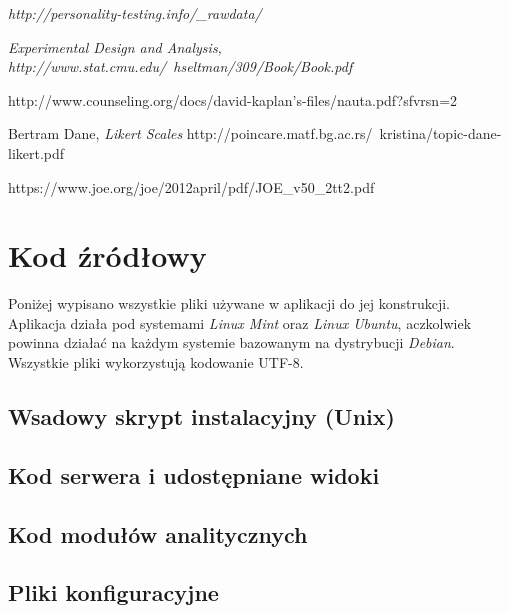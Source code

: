 \documentclass[12pt,a4paper,oneside]{report} %
\begin{document}
\begin{thebibliography}{9}
 \emph{http://personality-testing.info/\_rawdata/}

 \emph{Experimental Design and Analysis, http://www.stat.cmu.edu/~hseltman/309/Book/Book.pdf}

 http://www.counseling.org/docs/david-kaplan's-files/nauta.pdf?sfvrsn=2

 Bertram Dane, \emph{Likert Scales} http://poincare.matf.bg.ac.rs/~kristina/topic-dane-likert.pdf

   https://www.joe.org/joe/2012april/pdf/JOE\_v50\_2tt2.pdf

\end{thebibliography}

\listoffigures

\listoftables

\appendix
\chapter{Kod źródłowy}
Poniżej wypisano wszystkie pliki używane w aplikacji do jej konstrukcji. Aplikacja działa pod systemami \emph{Linux Mint} oraz \emph{Linux Ubuntu}, aczkolwiek powinna działać na każdym systemie bazowanym na dystrybucji \emph{Debian}. Wszystkie pliki wykorzystują kodowanie UTF-8.
\section{Wsadowy skrypt instalacyjny (Unix)}


\section{Kod serwera i udostępniane widoki}








\section{Kod modułów analitycznych}



\section{Pliki konfiguracyjne}



\end{document}
